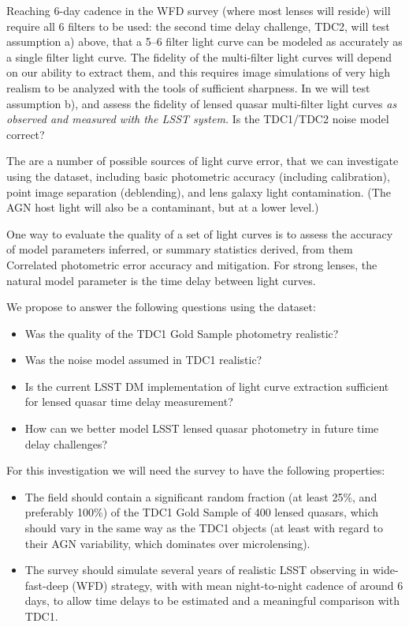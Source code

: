 Reaching 6-day cadence  in the WFD survey (where most lenses will
reside) will require all 6 filters to be used: the second time delay
challenge, TDC2, will test assumption a) above, that  a 5--6 filter
light curve can be modeled as accurately as a single filter light
curve. The fidelity of the multi-filter light curves will depend on
our ability to extract them, and this requires image simulations of
very high realism to be analyzed with the tools of sufficient
sharpness. In \TwinklesOne we will test assumption b), and assess the
fidelity of lensed quasar multi-filter light curves {\it as observed and
measured with the LSST system.} Is the TDC1/TDC2 noise model correct?

The are a number of possible sources of light curve error, that we can
investigate using the \TwinklesOne dataset, including basic photometric
accuracy (including calibration), point image separation (deblending), and
lens galaxy light contamination. (The AGN host light will also be a contaminant,
but at a lower level.)

One way to evaluate the quality of a set of light curves is to assess the accuracy of
model parameters inferred, or summary statistics derived, from them
Correlated photometric error accuracy and mitigation. For strong lenses,
the natural model parameter is the time delay between light curves.

We propose to answer the following questions using the \TwinklesOne dataset:
\begin{itemize}
\item Was the quality of the TDC1 Gold Sample photometry realistic?
\item Was the noise model assumed in TDC1 realistic?
\item Is the current LSST DM implementation of light curve extraction
      sufficient for lensed quasar time delay measurement?
\item How can we better model LSST lensed quasar photometry in
      future time delay challenges?
\end{itemize}


For this investigation we will need the \TwinklesOne survey to have the following
properties:
\begin{itemize}
\item The field should contain a significant random fraction (at least
25\%,  and preferably 100\%) of the TDC1 Gold Sample of 400 lensed
quasars,  which should vary in the same way as the TDC1 objects (at
least with regard to their  AGN variability, which dominates over
microlensing).
\item The survey should simulate several years of realistic LSST observing in
wide-fast-deep (WFD) strategy, with with mean night-to-night
cadence of around 6 days, to allow time delays to be estimated
and a meaningful comparison with TDC1.
\end{itemize}


